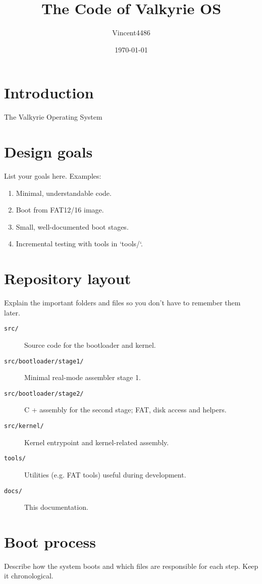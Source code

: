 \documentclass[11pt,a4paper]{article}
\title{The Code of Valkyrie OS}
\author{Vincent4486}
\date{\today}
\begin{document}
\maketitle

\clearpage

\section{Introduction}
The Valkyrie Operating System 

\section{Design goals}
List your goals here. Examples:
\begin{enumerate}
	\item Minimal, understandable code.
	\item Boot from FAT12/16 image.
	\item Small, well-documented boot stages.
	\item Incremental testing with tools in `tools/`.
\end{enumerate}

\section{Repository layout}
Explain the important folders and files so you don't have to remember them later.
\begin{description}
	\item[\texttt{src/}] Source code for the bootloader and kernel.
	\item[\texttt{src/bootloader/stage1/}] Minimal real-mode assembler stage 1.
	\item[\texttt{src/bootloader/stage2/}] C + assembly for the second stage; FAT, disk access and helpers.
	\item[\texttt{src/kernel/}] Kernel entrypoint and kernel-related assembly.
	\item[\texttt{tools/}] Utilities (e.g. FAT tools) useful during development.
	\item[\texttt{docs/}] This documentation.
\end{description}

\section{Boot process}
Describe how the system boots and which files are responsible for each step. Keep it chronological.
\end{document}
